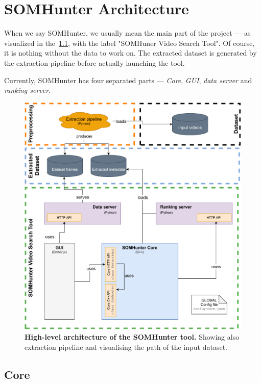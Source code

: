 \chapter{SOMHunter Architecture}
\label{arch}


When we say SOMHunter, we usually mean the main part of the project --- as visualized in the~\cref{fig:sh-arch}, with the label "SOMHuner Video Search Tool". Of course, it is nothing without the data to work on. The extracted dataset is generated by the extraction pipeline before actually launching the tool.

Currently, SOMHunter has four separated parts --- \emph{Core}, \emph{GUI}, \emph{data server} and \emph{ranking server}.


\begin{figure}[b]
	\centering
	\includegraphics[width=1.0\textwidth]{img/diagrams/sh-arch.pdf}
	\caption{\textbf{High-level architecture of the SOMHunter tool.} Showing also extraction pipeline and visualising the path of the input dataset.}
	\label{fig:sh-arch}
\end{figure}

\section{Core}

